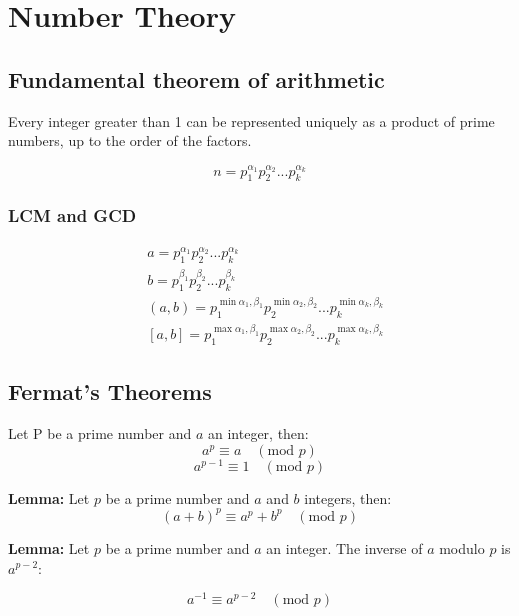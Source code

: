 \section{Number Theory}

\subsection{Fundamental theorem of arithmetic}

Every integer greater than 1 can be represented uniquely as a product of prime numbers, up to the order of the factors.

\begin{equation}
    n = p_1^{\alpha_1} p_2^{\alpha_2} ... p_k^{\alpha_k}
\end{equation}

\subsubsection{LCM and GCD}

\begin{equation}
\begin{aligned}
    & a = p_1^{\alpha_1} p_2^{\alpha_2} ... p_k^{\alpha_k}  \\
    & b = p_1^{\beta_1} p_2^{\beta_2} ... p_k^{\beta_k} \\
    & (a,b) = p_1^{\min{{\alpha_1, \beta_1}}} p_2^{\min{{\alpha_2, \beta_2}}} ... p_k^{\min{{\alpha_k, \beta_k}}} \\
    & [a,b] = p_1^{\max{{\alpha_1, \beta_1}}} p_2^{\max{{\alpha_2, \beta_2}}} ... p_k^{\max{{\alpha_k, \beta_k}}}
\end{aligned}
\end{equation}


\subsection{Fermat's Theorems}

Let P be a prime number and $a$ an integer, then:
$$a^p \equiv a \quad (\text{mod } p)$$
$$a^{p-1} \equiv 1 \quad (\text{mod } p)$$

\textbf{Lemma:} Let $p$ be a prime number and $a$ and $b$ integers, then: 
$$(a+b)^{p} \equiv a^{p} + b^{p} \quad (\text{mod } p)$$

\textbf{Lemma:} Let $p$ be a prime number and $a$ an integer. The inverse of $a$ modulo $p$ is $a^{p-2}$:

$$a^{-1} \equiv a^{p-2} \quad (\text{mod } p)$$

